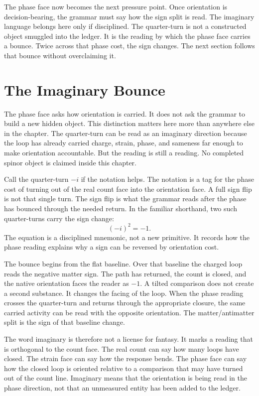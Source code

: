 The phase face now becomes the next pressure point. Once orientation is
decision-bearing, the grammar must say how the sign split is read. The
imaginary language belongs here only if disciplined. The quarter-turn is not
a constructed object smuggled into the ledger. It is the reading by which the
phase face carries a bounce. Twice across that phase cost, the sign changes.
The next section follows that bounce without overclaiming it.

\section{The Imaginary Bounce}

The phase face asks how orientation is carried. It does not ask the grammar
to build a new hidden object. This distinction matters here more than
anywhere else in the chapter. The quarter-turn can be read as an imaginary
direction because the loop has already carried charge, strain, phase, and
sameness far enough to make orientation accountable. But the reading is still
a reading. No completed spinor object is claimed inside this chapter.

Call the quarter-turn \(-i\) if the notation helps. The notation is a tag for
the phase cost of turning out of the real count face into the orientation
face. A full sign flip is not that single turn. The sign flip is what the
grammar reads after the phase has bounced through the needed return. In the
familiar shorthand, two such quarter-turns carry the sign change:
\[
  (-i)^2 = -1 .
\]
The equation is a disciplined mnemonic, not a new primitive. It records how
the phase reading explains why a sign can be reversed by orientation cost.

The bounce begins from the flat baseline. Over that baseline the charged loop
reads the negative matter sign. The path has returned, the count is closed,
and the native orientation faces the reader as \(-1\). A tilted comparison
does not create a second substance. It changes the facing of the loop. When
the phase reading crosses the quarter-turn and returns through the
appropriate closure, the same carried activity can be read with the opposite
orientation. The matter/antimatter split is the sign of that baseline change.

The word imaginary is therefore not a license for fantasy. It marks a
reading that is orthogonal to the count face. The real count can say how many
loops have closed. The strain face can say how the response bends. The phase
face can say how the closed loop is oriented relative to a comparison that
may have turned out of the count line. Imaginary means that the orientation
is being read in the phase direction, not that an unmeasured entity has been
added to the ledger.

